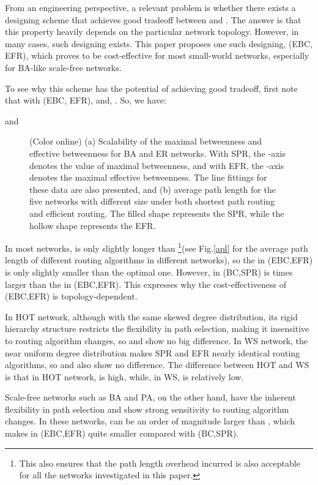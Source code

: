 \documentclass[journal]{IEEEtran}
\begin{document}
{From an engineering perspective, a relevant problem is whether there
exists a designing scheme that achieves good tradeoff between 
and . The answer is that this property heavily depends on
the particular network topology. However, in many cases, such
designing exists.  This paper proposes one such designing, (EBC,
EFR), which proves to be cost-effective for most small-world
networks, especially for BA-like scale-free networks.

To see why this scheme has the potential of achieving good tradeoff,
first note that with (EBC, EFR),  and,
. So, we have:




and



\begin{figure*}[!t]
\centering
  
 \caption{(Color online) (a) Scalability of the maximal betweenness and
effective betweenness for BA and ER networks. With SPR, the -axis
denotes the value of maximal betweenness, and with EFR, the -axis
denotes the maximal effective betweenness. The line fittings for
these data are also presented, and (b) average path length for the
five networks with different size under both shortest path routing
and efficient routing. The filled shape represents the SPR, while
the hollow shape represents the EFR.}
\end{figure*}
In most networks,  is only slightly longer than 
\footnote{This also ensures that the path length overhead incurred
is also acceptable for all the networks investigated in this
paper.}(see Fig.\ref{apl} for the average path length of different
routing algorithms in different networks), so the  in (EBC,EFR)
is only slightly smaller than the optimal one.   However, 
in (BC,SPR) is
 times
larger than the  in (EBC,EFR). This expresses why the
cost-effectiveness of (EBC,EFR) is topology-dependent.

In HOT network, although with the same skewed degree distribution,
its rigid hierarchy structure restricts the flexibility in path
selection, making it insensitive to routing algorithm changes, so
 and  show no big difference. In WS
network, the near uniform degree distribution makes SPR and EFR
nearly identical routing algorithms, so  and
 also show no difference. The difference between
HOT and WS is that in HOT network,  is high, while, in WS,
 is relatively low.

Scale-free networks such as BA and PA, on the other hand, have the
inherent flexibility in path selection and show strong sensitivity
to routing algorithm changes. In these networks,  can be an
order of magnitude larger than , which makes
 in (EBC,EFR) quite smaller compared with (BC,SPR).

}
\end{document}
